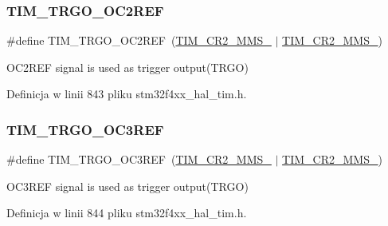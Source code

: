 \subsubsection{\texorpdfstring{T\+I\+M\+\_\+\+T\+R\+G\+O\+\_\+\+O\+C2\+R\+EF}{TIM\_TRGO\_OC2REF}}
{\footnotesize\ttfamily \#define T\+I\+M\+\_\+\+T\+R\+G\+O\+\_\+\+O\+C2\+R\+EF~(\hyperlink{group___peripheral___registers___bits___definition_gacb74a815afdd856d51cfcf1ddf3fce6a}{T\+I\+M\+\_\+\+C\+R2\+\_\+\+M\+M\+S\+\_} $\vert$ \hyperlink{group___peripheral___registers___bits___definition_gaf3e55308e84106d6501201e66bd46ab6}{T\+I\+M\+\_\+\+C\+R2\+\_\+\+M\+M\+S\+\_})}

O\+C2\+R\+EF signal is used as trigger output(\+T\+R\+G\+O) 

Definicja w linii 843 pliku stm32f4xx\+\_\+hal\+\_\+tim.\+h.

\mbox{\label{group___t_i_m___master___mode___selection_ga4bc4791f8b9560950d30078b96d08f55}} 
\subsubsection{\texorpdfstring{T\+I\+M\+\_\+\+T\+R\+G\+O\+\_\+\+O\+C3\+R\+EF}{TIM\_TRGO\_OC3REF}}
{\footnotesize\ttfamily \#define T\+I\+M\+\_\+\+T\+R\+G\+O\+\_\+\+O\+C3\+R\+EF~(\hyperlink{group___peripheral___registers___bits___definition_gacb74a815afdd856d51cfcf1ddf3fce6a}{T\+I\+M\+\_\+\+C\+R2\+\_\+\+M\+M\+S\+\_} $\vert$ \hyperlink{group___peripheral___registers___bits___definition_ga4b1036929b0a4ba5bd5cced9b8e0f4c3}{T\+I\+M\+\_\+\+C\+R2\+\_\+\+M\+M\+S\+\_})}

O\+C3\+R\+EF signal is used as trigger output(\+T\+R\+G\+O) 

Definicja w linii 844 pliku stm32f4xx\+\_\+hal\+\_\+tim.\+h.

\mbox{\label{group___t_i_m___master___mode___selection_ga7fe6228adec5d1b6f0a8ed8da111db4d}} 
